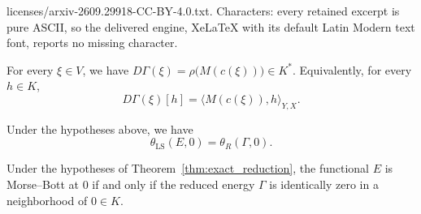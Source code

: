 \documentclass[10pt,a4paper]{amsart}
\begin{document}
licenses/arxiv-2609.29918-CC-BY-4.0.txt. Characters: every retained excerpt is pure ASCII, so the delivered engine, XeLaTeX with its default Latin Modern text font, reports no missing character.
\begin{lemma} \label{lem:gradient_identity}
For every $\xi \in V$, we have $D\Gamma(\xi) = \rho\bigl(M(c(\xi))\bigr) \in K^*$.
Equivalently, for every $h \in K$, 
$$D\Gamma(\xi)[h] = \langle M(c(\xi)),h\rangle_{Y,X}.$$
\end{lemma}

\begin{theorem} \label{thm:exact_reduction}
Under the hypotheses above, we have
$$\theta_{\mathrm{LS}}(E,0) = \theta_R(\Gamma,0).$$
\end{theorem}

\begin{proposition} \label{prop:morse_bott_reduction}
Under the hypotheses of Theorem~\ref{thm:exact_reduction}, the functional $E$ is Morse--Bott at $0$ if and only if the reduced energy $\Gamma$ is identically zero in a neighborhood of $0 \in K$. 
\end{proposition}
\end{document}
